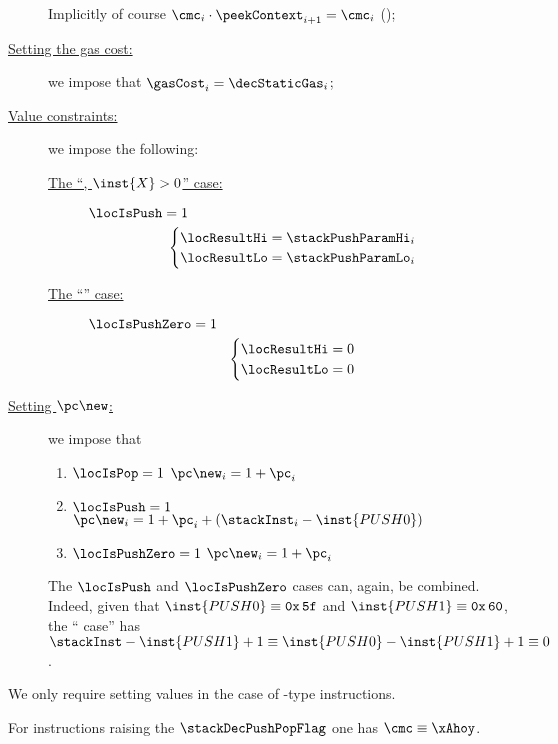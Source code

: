 \begin{description}
		\saNote{}
		Implicitly of course $\cmc_{i} \cdot \peekContext_{i + 1} = \cmc_{i}$ (\trash);
	\item[\underline{Setting the gas cost:}]
		we impose that $\gasCost_{i} = \decStaticGas_{i}$;
	\item[\underline{Value constraints:}]
		we impose the following:
		\begin{description}
			\item[\underline{The ``, $\inst{X} > 0$'' case:}] 
				\label{hub: instruction handling: push pop: setting result to push value for PUSHX}
				\If $\locIsPush = 1$ \Then
				\[
					\begin{cases}
						\locResultHi = \stackPushParamHi_{i} \\
						\locResultLo = \stackPushParamLo_{i} \\
					\end{cases}
				\]
			\item[\underline{The ``'' case:}] 
				\label{hub: instruction handling: push pop: setting result to zero for PUSH0}
				\If $\locIsPushZero = 1$ \Then
				\[
					\begin{cases}
						\locResultHi = 0 \\
						\locResultLo = 0 \\
					\end{cases}
				\]
		\end{description}
	\item[\underline{Setting $\pc\new$:}]
		we impose that
		\begin{enumerate}
			\item \If $\locIsPop      = 1$ \Then $\pc\new_{i} = 1 + \pc_{i}$
			\item \If $\locIsPush     = 1$ \Then $\pc\new_{i} = 1 + \pc_{i} + (\stackInst_{i} - \inst{PUSH0})$
			\item \If $\locIsPushZero = 1$ \Then $\pc\new_{i} = 1 + \pc_{i}$
		\end{enumerate}
		\saNote{}
		The $\locIsPush$ and $\locIsPushZero$ cases
		can, again, be combined.
		Indeed, given that
		$\inst{PUSH0} \equiv \texttt{0x\,5f}$ and
		$\inst{PUSH1} \equiv \texttt{0x\,60}$,
		the `` case'' has
		$\stackInst - \inst{PUSH1} + 1 \equiv \inst{PUSH0} - \inst{PUSH1} + 1 \equiv 0$.
\end{description}
\saNote{}
We only require setting values in the case of -type instructions.

\saNote{}
For instructions raising the $\stackDecPushPopFlag$ one has $\cmc \equiv \xAhoy$.
